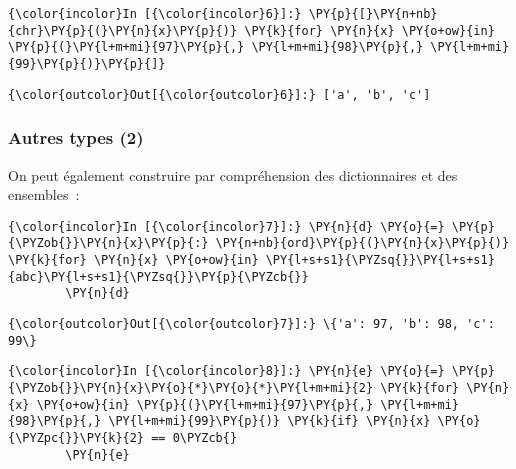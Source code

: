     \begin{Verbatim}[commandchars=\\\{\},frame=single,framerule=0.3mm,rulecolor=\color{cellframecolor}]
{\color{incolor}In [{\color{incolor}6}]:} \PY{p}{[}\PY{n+nb}{chr}\PY{p}{(}\PY{n}{x}\PY{p}{)} \PY{k}{for} \PY{n}{x} \PY{o+ow}{in} \PY{p}{(}\PY{l+m+mi}{97}\PY{p}{,} \PY{l+m+mi}{98}\PY{p}{,} \PY{l+m+mi}{99}\PY{p}{)}\PY{p}{]}
\end{Verbatim}


\begin{Verbatim}[commandchars=\\\{\},frame=single,framerule=0.3mm,rulecolor=\color{cellframecolor}]
{\color{outcolor}Out[{\color{outcolor}6}]:} ['a', 'b', 'c']
\end{Verbatim}
            
    \hypertarget{autres-types-2}{%
\subsubsection{Autres types (2)}\label{autres-types-2}}

    On peut également construire par compréhension des dictionnaires et des
ensembles~:

    \begin{Verbatim}[commandchars=\\\{\},frame=single,framerule=0.3mm,rulecolor=\color{cellframecolor}]
{\color{incolor}In [{\color{incolor}7}]:} \PY{n}{d} \PY{o}{=} \PY{p}{\PYZob{}}\PY{n}{x}\PY{p}{:} \PY{n+nb}{ord}\PY{p}{(}\PY{n}{x}\PY{p}{)} \PY{k}{for} \PY{n}{x} \PY{o+ow}{in} \PY{l+s+s1}{\PYZsq{}}\PY{l+s+s1}{abc}\PY{l+s+s1}{\PYZsq{}}\PY{p}{\PYZcb{}}
        \PY{n}{d}
\end{Verbatim}


\begin{Verbatim}[commandchars=\\\{\},frame=single,framerule=0.3mm,rulecolor=\color{cellframecolor}]
{\color{outcolor}Out[{\color{outcolor}7}]:} \{'a': 97, 'b': 98, 'c': 99\}
\end{Verbatim}
            
    \begin{Verbatim}[commandchars=\\\{\},frame=single,framerule=0.3mm,rulecolor=\color{cellframecolor}]
{\color{incolor}In [{\color{incolor}8}]:} \PY{n}{e} \PY{o}{=} \PY{p}{\PYZob{}}\PY{n}{x}\PY{o}{*}\PY{o}{*}\PY{l+m+mi}{2} \PY{k}{for} \PY{n}{x} \PY{o+ow}{in} \PY{p}{(}\PY{l+m+mi}{97}\PY{p}{,} \PY{l+m+mi}{98}\PY{p}{,} \PY{l+m+mi}{99}\PY{p}{)} \PY{k}{if} \PY{n}{x} \PY{o}{\PYZpc{}}\PY{k}{2} == 0\PYZcb{}
        \PY{n}{e}
\end{Verbatim}


